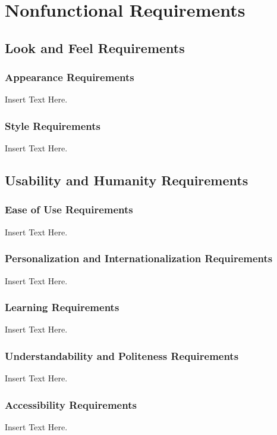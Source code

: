 \documentclass [12pt]{article}
\begin{document}

\section {Nonfunctional Requirements} 



\subsection {Look and Feel Requirements}
\subsubsection{Appearance Requirements}
Insert Text Here. 

\subsubsection{Style Requirements}
Insert Text Here. 


\subsection{Usability and Humanity Requirements} 
\subsubsection{Ease of Use Requirements}
Insert Text Here.

\subsubsection{Personalization and Internationalization Requirements}
Insert Text Here.

\subsubsection{Learning Requirements }
Insert Text Here.

\subsubsection{Understandability and Politeness Requirements}
Insert Text Here.
		
\subsubsection{Accessibility Requirements }
Insert Text Here.
 
\end{document}
